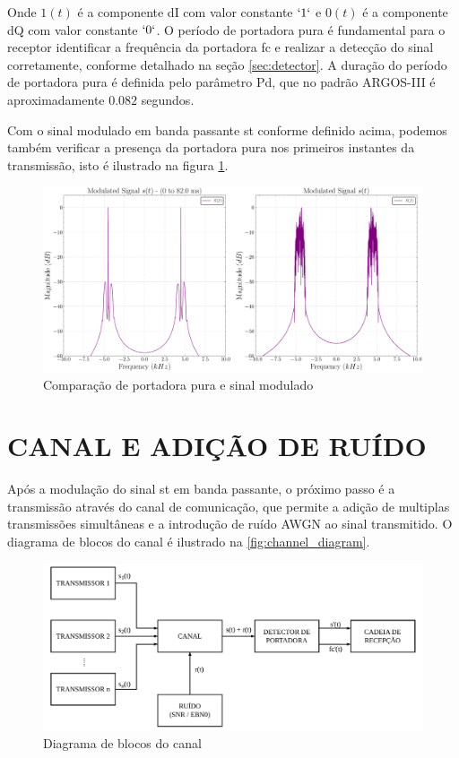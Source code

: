 \noindent Onde $1(t)$ é a componente \gls{dI} com valor constante $`1`$ e $0(t)$ é a componente \gls{dQ} com valor constante $`0`$. O período de portadora pura é fundamental para o receptor identificar a frequência da portadora \gls{fc} e realizar a detecção do sinal corretamente, conforme detalhado na seção \ref{sec:detector}. A duração do período de portadora pura é definida pelo parâmetro \gls{Pd}, que no padrão \gls{ARGOS-III} é aproximadamente $0.082$ segundos.

Com o sinal modulado em banda passante \gls{st} conforme definido acima, podemos também verificar a presença da portadora pura nos primeiros instantes da transmissão, isto é ilustrado na figura \ref{fig:transmitter_modulator_portadora}.

\begin{figure}[H]
	\centering
	\caption{Comparação de portadora pura e sinal modulado}\label{fig:transmitter_modulator_portadora}
	\includegraphics[width=\linewidth]{assets/cap3/transmitter_modulator_portadora.pdf}
\end{figure}

\section{CANAL E ADIÇÃO DE RUÍDO}\label{sec:canal}


Após a modulação do sinal \gls{st} em banda passante, o próximo passo é a transmissão através do canal de comunicação, que permite a adição de multiplas transmissões simultâneas e a introdução de ruído \gls{AWGN} ao sinal transmitido. O diagrama de blocos do canal é ilustrado na \autoref{fig:channel_diagram}.

\begin{figure}[H]
	\centering
	\caption{Diagrama de blocos do canal}\label{fig:channel_diagram}
	\includegraphics[width=\linewidth]{assets/diagrams/channel.pdf}
\end{figure}

